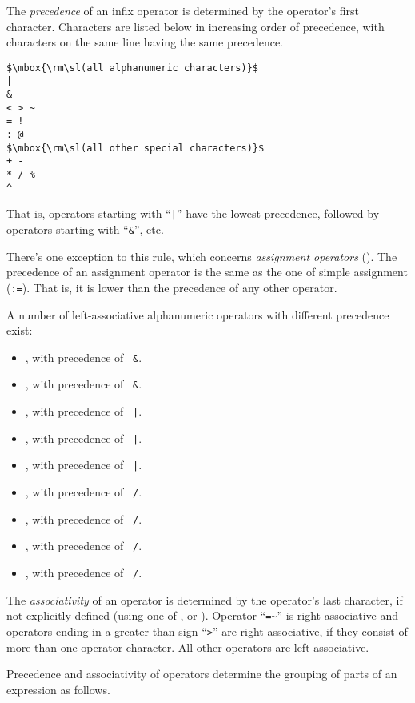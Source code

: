 The {\em precedence} of an infix operator is determined by the operator's first character. Characters are listed below in increasing order of precedence, with characters on the same line having the same precedence.

\begin{lstlisting}
$\mbox{\rm\sl(all alphanumeric characters)}$
|
&
< > ~
= !
: @
$\mbox{\rm\sl(all other special characters)}$
+ -
* / %
^
\end{lstlisting}

That is, operators starting with ``\lstinline!|!'' have the lowest precedence, followed by operators starting with ``\lstinline!&!'', etc. 

There's one exception to this rule, which concerns {\em assignment operators} (). The precedence of an assignment operator is the same as the one of simple assignment (\lstinline!:=!). That is, it is lower than the precedence of any other operator. 

A number of left-associative alphanumeric operators with different precedence exist:
\begin{itemize}
  \item {}, with precedence of ~\lstinline!&!. 
  \item {}, with precedence of ~\lstinline!&!. 
  \item {}, with precedence of ~\lstinline!|!.  
  \item {}, with precedence of ~\lstinline!|!.  
  \item {}, with precedence of ~\lstinline!|!.  
  \item {}, with precedence of ~\lstinline!/!. 
  \item {}, with precedence of ~\lstinline!/!. 
  \item {}, with precedence of ~\lstinline!/!. 
  \item {}, with precedence of ~\lstinline!/!.   
\end{itemize}

The {\em associativity} of an operator is determined by the operator's last character, if not explicitly defined (using one of ,  or ). Operator ``\lstinline!=~!'' is right-associative and operators ending in a greater-than sign ``\lstinline!>!'' are right-associative, if they consist of more than one operator character. All other operators are left-associative. 

Precedence and associativity of operators determine the grouping of parts of an expression as follows.

